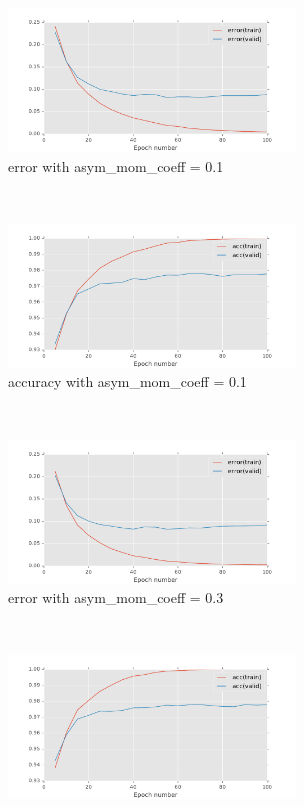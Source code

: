 \documentclass[11pt]{article}
\begin{document}
\begin{figure}[t!]
    \centering
    \begin{subfigure}[t]{0.45\textwidth}
        \centering
        \includegraphics[height=1.5in]{error_with_asy_mom_0_1.pdf}
        \caption{error with asym\_mom\_coeff = 0.1}
    \end{subfigure}   
    ~
    \begin{subfigure}[t]{0.45\textwidth}
        \centering
        \includegraphics[height=1.5in]{acc_with_asy_mom_0_1.pdf}
        \caption{accuracy with asym\_mom\_coeff = 0.1}
    \end{subfigure}
    ~ 
    \begin{subfigure}[t]{0.45\textwidth}
        \centering
        \includegraphics[height=1.5in]{error_with_asy_mom_0_3.pdf}
        \caption{error with asym\_mom\_coeff = 0.3}
    \end{subfigure}   
    ~
    \begin{subfigure}[t]{0.45\textwidth}
        \centering
        \includegraphics[height=1.5in]{acc_with_asy_mom_0_3.pdf}

\end{subfigure}
\end{figure}
\end{document}
